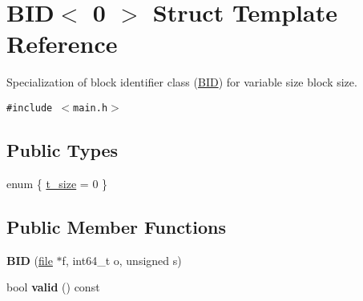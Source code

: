 \hypertarget{structBID_3_010_01_4}{
\section{BID$<$ 0 $>$ Struct Template Reference}
\label{structBID_3_010_01_4}
}
Specialization of block identifier class (\hyperlink{structBID}{BID}) for variable size block size.  


{\tt \#include $<$main.h$>$}

\subsection*{Public Types}
\begin{CompactItemize}
\item 
enum \{ \hyperlink{group__mnglayer_ggd7fa741aa0ccf5fb9b7b0085669864d3955b5433f4e53a6b37036545e6af766f}{t\_\-size} =  0
 \}
\end{CompactItemize}
\subsection*{Public Member Functions}
\begin{CompactItemize}
\item 
\hypertarget{group__mnglayer_g0bcd10c5f95291a7e112c6d37382c6b2}{
\textbf{BID} (\hyperlink{classfile}{file} $\ast$f, int64\_\-t o, unsigned s)}
\label{group__mnglayer_g0bcd10c5f95291a7e112c6d37382c6b2}

\item 
\hypertarget{group__mnglayer_gdd9f3b28293eff6ecb6ed431e4c1973e}{
bool \textbf{valid} () const }
\label{group__mnglayer_gdd9f3b28293eff6ecb6ed431e4c1973e}

\end{CompactItemize}
